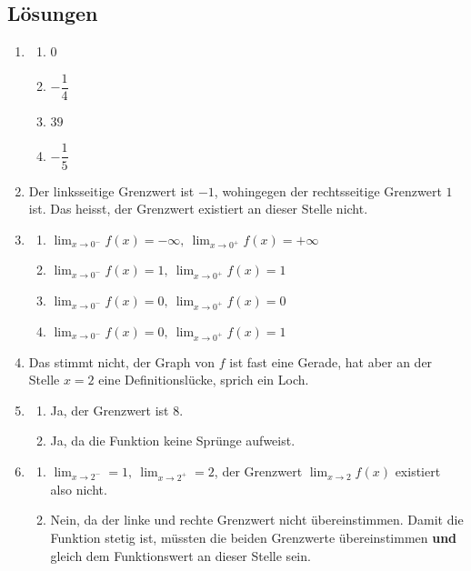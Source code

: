 \subsection*{Lösungen}
\begin{enumerate}
    \item \begin{enumerate}
              \item $0$
              \item $-\dfrac{1}{4}$
              \item $39$
              \item $-\dfrac{1}{5}$
          \end{enumerate}
    \item Der linksseitige Grenzwert ist $-1$, wohingegen der rechtsseitige Grenzwert $1$ ist. Das heisst, der Grenzwert existiert an dieser Stelle nicht.
    \item \begin{enumerate}
              \item $\lim_{x\to 0^-}f(x) = -\infty,\ \lim_{x\to 0^+}f(x) = +\infty$
              \item $\lim_{x\to 0^-}f(x) = 1,\ \lim_{x\to 0^+}f(x) = 1$
              \item $\lim_{x\to 0^-}f(x) = 0,\ \lim_{x\to 0^+}f(x) = 0$
              \item $\lim_{x\to 0^-}f(x) = 0,\ \lim_{x\to 0^+}f(x) = 1$
          \end{enumerate}
    \item Das stimmt nicht, der Graph von $f$ ist fast eine Gerade, hat aber an der Stelle $x=2$ eine Definitionslücke, sprich ein \glqq Loch\grqq{}.
    \item \begin{enumerate}
              \item Ja, der Grenzwert ist $8$.
              \item Ja, da die Funktion keine Sprünge aufweist.
          \end{enumerate}
    \item \begin{enumerate}
              \item $\displaystyle \lim_{x \to 2^-}=1,\ \lim_{x \to 2^+}=2$, der Grenzwert $\lim_{x\to 2}f(x)$ existiert also nicht.
              \item Nein, da der linke und rechte Grenzwert nicht übereinstimmen. Damit die Funktion stetig ist, müssten die beiden Grenzwerte übereinstimmen \textbf{und} gleich dem Funktionswert an dieser Stelle sein.

\end{enumerate}
\end{enumerate}
